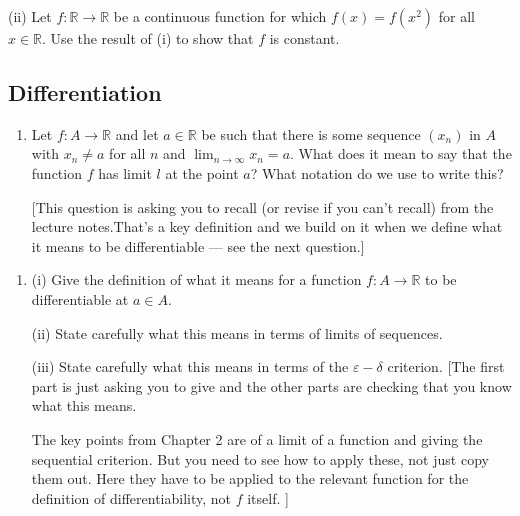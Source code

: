 \documentclass[letterpaper,10pt,english]{jupyterBook}
\begin{document}
\sphinxAtStartPar
(ii) Let \(f: \mathbb{R} \rightarrow \mathbb{R}\) be a continuous function for which \(f(x) = f(x^{2})\) for all \(x \in \mathbb{R}\). Use the result of (i) to show that \(f\) is constant.


\subsection{Differentiation}
\label{\detokenize{Problems:differentiation}}\label{\detokenize{Problems:ch4prob}}\label{\detokenize{Problems:id37}}\begin{enumerate}
%
\setcounter{enumi}{36}
\item {} 
\sphinxAtStartPar
Let \(f:A\to\mathbb{R}\) and let \(a\in\mathbb{R}\) be such that there is some sequence \((x_n)\) in \(A\) with
\(x_n\neq a\) for all \(n\) and \(\displaystyle\lim_{n\to\infty} x_n=a\). What does it mean to say that
the function \(f\) has limit \(l\) at the point \(a\)? What notation do we use to write this?

{[}This question is asking you to recall (or revise if you can’t recall)  from the lecture notes.That’s a key definition and we build on it when we define what it means to be differentiable — see the next question.{]}

\end{enumerate}
\label{\detokenize{Problems:id38}}\begin{enumerate}
%
\setcounter{enumi}{37}
\item {} 
\sphinxAtStartPar
(i) Give the definition of what it means for a function \(f:A\to\mathbb{R}\) to be differentiable at \(a \in A\).

\sphinxAtStartPar
(ii) State carefully what this means in terms of limits of sequences.

\sphinxAtStartPar
(iii) State carefully what this means in terms of the \(\varepsilon-\delta\) criterion.
{[}The first part is just asking you to give  and the other parts are checking that you know what this means.

The key points from Chapter 2 are  of a limit of a function and  giving the sequential criterion. But you need to see how to apply these, not just copy them out. Here they have to be applied to the relevant function for the definition of differentiability, not \(f\) itself. {]}

\end{enumerate}
\end{document}
